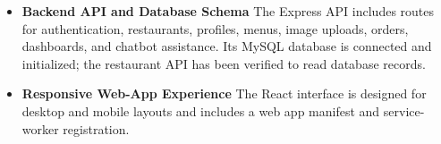 \begin{itemize}
    \item \textbf{Backend API and Database Schema}
    The Express API includes routes for authentication, restaurants, profiles, menus, image uploads, orders, dashboards, and chatbot assistance. Its MySQL database is connected and initialized; the restaurant API has been verified to read database records.
    \vspace{0.3cm}

    \item \textbf{Responsive Web-App Experience}
    The React interface is designed for desktop and mobile layouts and includes a web app manifest and service-worker registration.

\end{itemize}

